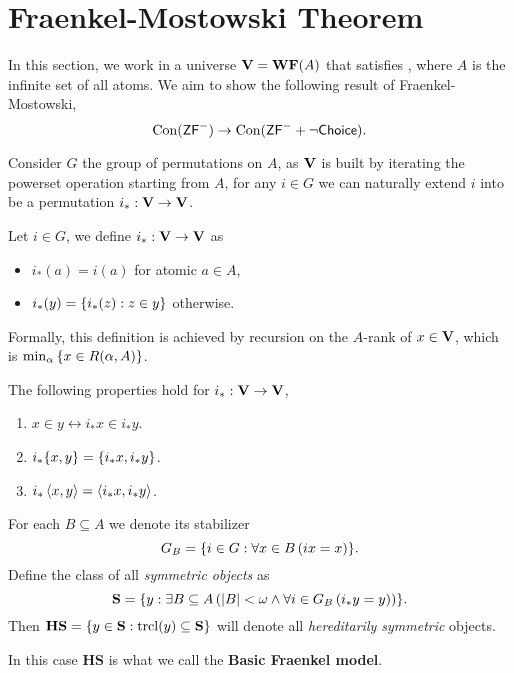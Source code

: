 \section{Fraenkel-Mostowski Theorem}

\newcommand{\Con}{\operatorname{Con}}
In this section, we work in a universe \(\mathbf{V} = \mathbf{WF}(A)\) that satisfies \ZFminus, where \(A\) is the infinite set of all atoms.
We aim to show the following result of Fraenkel-Mostowski,
\[\Con(\ZFminus) \to \Con(\ZFminus + \lnot\textsf{Choice}).\]

Consider \(G\) the group of permutations on \(A\),
as \(\mathbf{V}\) is built by iterating the powerset operation starting from \(A\),
for any \(i\in G\) we can naturally extend \(i\) into be a permutation \(i_*:\mathbf{V}\to\mathbf{V}\).
\begin{definition}
    Let \(i \in G\), we define \(i_*: \mathbf{V}\to\mathbf{V}\) as
    \begin{itemize}
        \item \(i_*(a) = i(a)\) for atomic \(a\in A\),
        \item \(i_*(y) = {\left\{ i_*(z): z\in y \right\}}\) otherwise.
    \end{itemize}
\end{definition}
\begin{remark}
    Formally, this definition is achieved by recursion on the \(A\)-rank of \(x\in\mathbf{V}\), which is \(\min_{\alpha} {\left\{ x\in R(\alpha,A) \right\}}\).
\end{remark}
\begin{observation}
    The following properties hold for \(i_*:\mathbf{V}\to\mathbf{V}\),
    \begin{enumerate}
        \item \(x\in y\leftrightarrow i_* x \in i_* y\).
        \item \(i_*{\left\{ x,y \right\}} = {\left\{ i_* x, i_* y \right\}}\).
        \item \(i_*\left\langle x,y\right\rangle = \left\langle i_* x, i_* y\right\rangle\).
    \end{enumerate}
\end{observation}

\begin{definition}
    For each \(B\subseteq A\) we denote its stabilizer
    \[ G_B = {\left\{ i\in G: \forall x\in B\left(i x = x\right) \right\}}.\]
    Define the class of all \emph{symmetric objects} as
    \[ \mathbf{S} = {\left\{ y:\exists B\subseteq A\left(\left\lvert B \right\rvert<\omega \land \forall i\in G_B\left(i_* y = y\right)\right) \right\}}. \]
    Then \(\mathbf{HS} = {\left\{ y\in \mathbf{S}:\operatorname{trcl}(y)\subseteq \mathbf{S} \right\}}\) will denote all \emph{hereditarily symmetric} objects.
\end{definition}
\begin{remark}
    In this case \(\mathbf{HS}\) is what we call the \textbf{Basic Fraenkel model}.
\end{remark}

